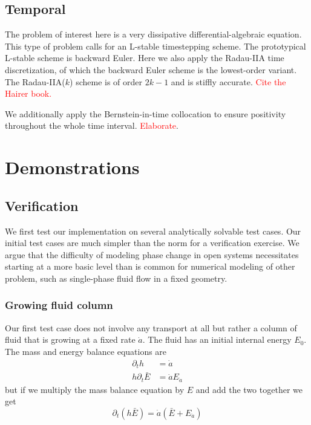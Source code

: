 \documentclass{article}
\theoremstyle{definition}
\theoremstyle{plain}
\begin{document}
\subsection{Temporal}

The problem of interest here is a very dissipative differential-algebraic equation.
This type of problem calls for an L-stable timestepping scheme.
The prototypical L-stable scheme is backward Euler.
Here we also apply the Radau-IIA time discretization, of which the backward Euler scheme is the lowest-order variant.
The Radau-IIA($k$) scheme is of order $2k - 1$ and is stiffly accurate.
\textcolor{red}{Cite the Hairer book.}

We additionally apply the Bernstein-in-time collocation to ensure positivity throughout the whole time interval.
\textcolor{red}{Elaborate}.



\section{Demonstrations}

\subsection{Verification}

We first test our implementation on several analytically solvable test cases.
Our initial test cases are much simpler than the norm for a verification exercise.
We argue that the difficulty of modeling phase change in open systems necessitates starting at a more basic level than is common for numerical modeling of other problem, such as single-phase fluid flow in a fixed geometry.

\subsubsection{Growing fluid column}
Our first test case does not involve any transport at all but rather a column of fluid that is growing at a fixed rate $\dot a$.
The fluid has an initial internal energy $E_0$.
The mass and energy balance equations are
\begin{align}
    \partial_t h & = \dot a \\
    h\partial_t \bar E & = \dot a E_{\dot a}
\end{align}
but if we multiply the mass balance equation by $E$ and add the two together we get
\begin{equation}
    \partial_t(h\bar E) = \dot a(\bar E + E_{\dot a})
\end{equation}
\end{document}

